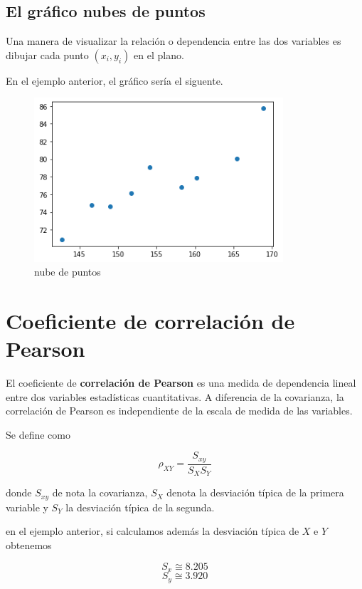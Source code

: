\documentclass[]{book}
\theoremstyle{plain}
\theoremstyle{definition}
\begin{document}
\hypertarget{el-gruxe1fico-nubes-de-puntos}{%
\subsection{El gráfico nubes de
puntos}\label{el-gruxe1fico-nubes-de-puntos}}

Una manera de visualizar la relación o dependencia entre las dos
variables es dibujar cada punto \((x_i, y_i)\) en el plano.

En el ejemplo anterior, el gráfico sería el siguente.

\begin{figure}
\centering
\includegraphics[width=3.64583in,height=\textheight]{img/cloud.png}
\caption{nube de puntos}
\end{figure}

\hypertarget{coeficiente-de-correlaciuxf3n-de-pearson}{%
\section{Coeficiente de correlación de
Pearson}\label{coeficiente-de-correlaciuxf3n-de-pearson}}

El coeficiente de \textbf{correlación de Pearson} es una medida de
dependencia lineal entre dos variables estadísticas cuantitativas. A
diferencia de la covarianza, la correlación de Pearson es independiente
de la escala de medida de las variables.

Se define como

\[\rho_{XY} = \frac{S_{xy}}{S_X S_Y}\]

donde \(S_{xy}\) de nota la covarianza, \(S_X\) denota la desviación
típica de la primera variable y \(S_Y\) la desviación típica de la
segunda.

en el ejemplo anterior, si calculamos además la desviación típica de
\(X\) e \(Y\) obtenemos

\[S_x \cong 8.205\] \[S_y \cong 3.920\]
\end{document}
